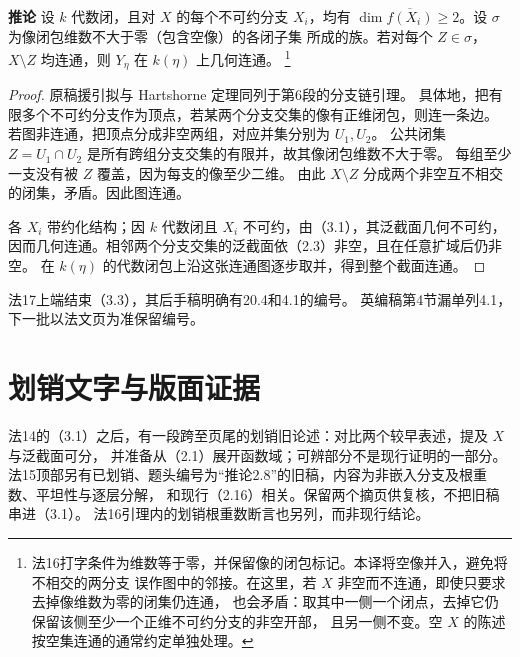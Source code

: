 \documentclass[openany,fontset=fandol]{ctexbook}
\newcommand{\tagitem}[2]{\par\medskip\noindent\textbf{#1\quad #2}\enspace}
\begin{document}
\tagitem{推论}{3.3}
设 $k$ 代数闭，且对 $X$ 的每个不可约分支 $X_i$，均有
$\dim\overline{f(X_i)}\ge2$。设 $\sigma$ 为像闭包维数不大于零（包含空像）的各闭子集
所成的族。若对每个 $Z\in\sigma$，$X\setminus Z$ 均连通，则 $Y_\eta$ 在 $k(\eta)$ 上几何连通。
\footnote{法16打字条件为维数等于零，并保留像的闭包标记。本译将空像并入，避免将不相交的两分支
误作图中的邻接。在这里，若 $X$ 非空而不连通，即使只要求去掉像维数为零的闭集仍连通，
也会矛盾：取其中一侧一个闭点，去掉它仍保留该侧至少一个正维不可约分支的非空开部，
且另一侧不变。空 $X$ 的陈述按空集连通的通常约定单独处理。}
\begin{proof}
原稿援引拟与 Hartshorne 定理同列于第6段的分支链引理。
具体地，把有限多个不可约分支作为顶点，若某两个分支交集的像有正维闭包，则连一条边。
若图非连通，把顶点分成非空两组，对应并集分别为 $U_1,U_2$。
公共闭集 $Z=U_1\cap U_2$ 是所有跨组分支交集的有限并，故其像闭包维数不大于零。
每组至少一支没有被 $Z$ 覆盖，因为每支的像至少二维。
由此 $X\setminus Z$ 分成两个非空互不相交的闭集，矛盾。因此图连通。

各 $X_i$ 带约化结构；因 $k$ 代数闭且 $X_i$ 不可约，由（3.1），其泛截面几何不可约，
因而几何连通。相邻两个分支交集的泛截面依（2.3）非空，且在任意扩域后仍非空。
在 $k(\eta)$ 的代数闭包上沿这张连通图逐步取并，得到整个截面连通。
\end{proof}
\noindent 法17上端结束（3.3），其后手稿明确有20.4和4.1的编号。
英编稿第4节漏单列4.1，下一批以法文页为准保留编号。

\section*{划销文字与版面证据}
法14的（3.1）之后，有一段跨至页尾的划销旧论述：对比两个较早表述，提及 $X$ 与泛截面可分，
并准备从（2.1）展开函数域；可辨部分不是现行证明的一部分。
法15顶部另有已划销、题头编号为“推论2.8”的旧稿，内容为非嵌入分支及根重数、平坦性与逐层分解，
和现行（2.16）相关。保留两个摘页供复核，不把旧稿串进（3.1）。
法16引理内的划销根重数断言也另列，而非现行结论。
\end{document}
